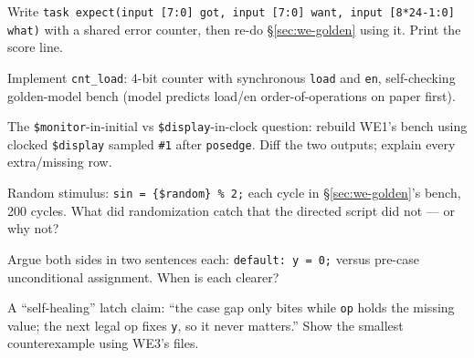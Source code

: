 \begin{exercise}[hard]
Write \texttt{task expect(input [7:0] got, input [7:0] want, input
[8*24-1:0] what)} with a shared error counter, then re-do
\S\ref{sec:we-golden} using it. Print the score line.
\end{exercise}
\begin{exercise}[hard]
Implement \texttt{cnt\_load}: 4-bit counter with synchronous
\texttt{load} and \texttt{en}, self-checking golden-model bench
(model predicts load/en order-of-operations on paper first).
\end{exercise}
\begin{exercise}[hard]
The \texttt{\$monitor}-in-initial vs \texttt{\$display}-in-clock
question: rebuild WE1's bench using clocked \texttt{\$display}
sampled \texttt{\#1} after \texttt{posedge}. Diff the two outputs;
explain every extra/missing row.
\end{exercise}
\begin{exercise}[hard]
Random stimulus: \texttt{sin = \{\$random\} \% 2;} each cycle in
\S\ref{sec:we-golden}'s bench, 200 cycles. What did randomization
catch that the directed script did not --- or why not?
\end{exercise}
\begin{exercise}[hard]
Argue both sides in two sentences each: \texttt{default: y = 0;}
versus pre-case unconditional assignment. When is each clearer?
\end{exercise}
\begin{exercise}[hard]
A ``self-healing'' latch claim: ``the case gap only bites while
\texttt{op} holds the missing value; the next legal op fixes
\texttt{y}, so it never matters.'' Show the smallest counterexample
using WE3's files.
\end{exercise}

